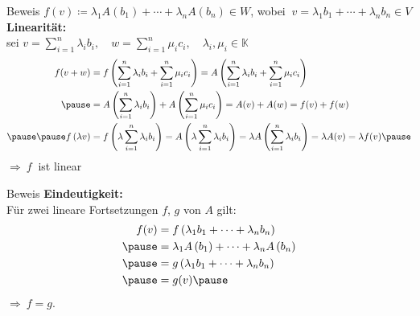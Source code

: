 \documentclass[AERbeamer%
,handout%
,optBeamerClassicFormat%
,optLeftEquations   %
]{AERlatex}
\begin{document}
%
    \begin{frame}{Beweis}
        \setlength{\baselineskip}{1.6\baselineskip}
%
        $f(v)\coloneqq\lambda_1 A\left(b_1\right)+\cdots+\lambda_n A\left(b_n\right) \in W$, wobei
        $~v=\lambda_1 b_1+\cdots+\lambda_n b_n \in V$ \\
        \vspace{0.5em}
        \textbf{Linearität:} \\
        sei $v=\sum_{i=1}^n \lambda_i b_i, \quad w=\sum_{i=1}^n \mu_i c_i, \quad \lambda_i, \mu_i \in \mathbb{K}$ \pause
        \begin{equation*}
            \begin{aligned}
                f(v+w) &=f\left(\sum_{i=1}^n \lambda_i b_i+\sum_{i=1}^n \mu_i c_i\right)=A\left(\sum_{i=1}^n \lambda_i b_i+\sum_{i=1}^n \mu_i c_i\right) \\ \pause
                &=A\left(\sum_{i=1}^n \lambda_i b_i\right)+A\left(\sum_{i=1}^n \mu_i c_i\right)=A(v)+A(w) = f(v)+f(w) \\ \pause \pause
                f\left(\lambda v\right) &=f\left(\lambda \sum_{i=1}^n \lambda_i b_i\right)=A\left(\lambda \sum_{i=1}^n \lambda_i b_i\right)=\lambda A\left(\sum_{i=1}^n \lambda_i b_i\right)=\lambda A(v)=\lambda f(v) \pause
            \end{aligned}
        \end{equation*}
        $\Rightarrow ~ f ~$ ist linear
    \end{frame}
%
    \begin{frame}{Beweis}
%
        \textbf{Eindeutigkeit:} \\
        Für zwei lineare Fortsetzungen $f$, $g$ von $A$ gilt:
        \begin{equation*}
            \begin{aligned}
                f(v) &=f\left(\lambda_1 b_1+\cdots+\lambda_n b_n\right) \\ \pause
                &=\lambda_1 A\left(b_1\right)+\cdots+\lambda_n A\left(b_n\right) \\ \pause
                &=g\left(\lambda_1 b_1+\cdots+\lambda_n b_n\right) \\ \pause
                &=g(v) \pause
            \end{aligned}
        \end{equation*}
        $\Rightarrow ~ f=g$.
    \end{frame}
%
\end{document}
